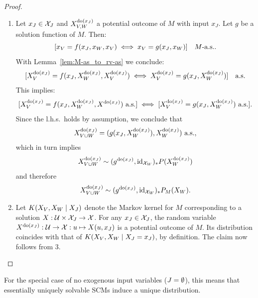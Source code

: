 \begin{proof}
\begin{enumerate}
    \item
    Let $x_J \in \mathcal{X}_J$ and $X^{\operatorname{do}(x_J)}_{V,W}$ a potential outcome of $M$ with input $x_J$.
    Let $g$ be a solution function of $M$.
    Then:
    $$[x_V = f(x_J,x_W,x_V) \iff x_V = g(x_J,x_W)] \quad M\text{-a.s.}.$$
    With Lemma~\ref{lem:M-as_to_rv-as} we conclude:
    $$[X^{\operatorname{do}(x_J)}_V = f(x_J,X^{\operatorname{do}(x_J)}_W,X^{\operatorname{do}(x_J)}_V) \iff X^{\operatorname{do}(x_J)}_V = g(x_J,X^{\operatorname{do}(x_J)}_W)] \quad \text{a.s.}$$
    This implies:
    $$[X^{\operatorname{do}(x_J)}_V = f(x_J,X^{\operatorname{do}(x_J)}_W,X^{\operatorname{do}(x_J)}) \text{ a.s.}] \iff [X^{\operatorname{do}(x_J)}_V = g(x_J,X^{\operatorname{do}(x_J)}_W) \text{ a.s.}].$$
    Since the l.h.s.\ holds by assumption, we conclude that
    $$X_{V\cup W}^{\operatorname{do}(x_J)} = (g(x_J,X^{\operatorname{do}(x_J)}_W), X^{\operatorname{do}(x_J)}_W)\ \text{a.s.},$$
    which in turn implies 
    $$X_{V\cup W}^{\operatorname{do}(x_{J})} \sim (g^{\operatorname{do}(x_{J})},\mathrm{id}_{\mathcal{X}_{W}})_* P(X^{\operatorname{do}(x_J)}_W)$$
    and therefore
    $$X_{V\cup W}^{\operatorname{do}(x_{J})} \sim (g^{\operatorname{do}(x_{J})},\mathrm{id}_{\mathcal{X}_{W}})_* P_M(X_W).$$

%

  \item
  Let $K(X_{V},X_{W} \mid X_{J})$ denote the Markov kernel for $M$ corresponding to a solution $X : \mathcal{U} \times \mathcal{X}_{J} \to \mathcal{X}$.
  For any $x_J \in \mathcal{X}_J$, the random variable $X^{\operatorname{do}(x_J)} : \mathcal{U} \to \mathcal{X} : u \mapsto X(u,x_J)$ is a potential outcome of $M$.
  Its distribution coincides with that of $K(X_{V},X_{W} \mid X_{J}=x_{J})$, by definition.
  The claim now follows from 3.
  \end{enumerate}
\end{proof}
For the special case of no exogenous input variables ($J = \emptyset$), this means that essentially uniquely solvable SCMs induce a unique distribution.

